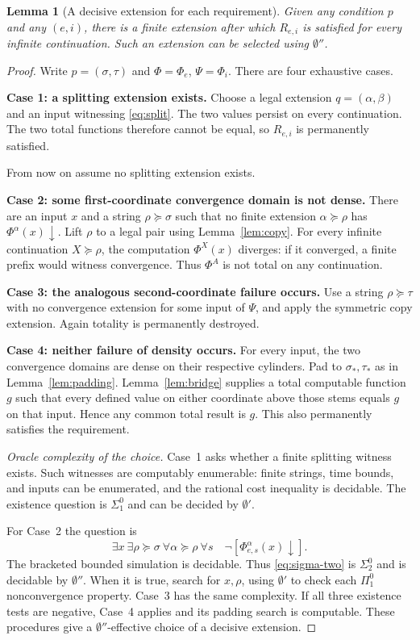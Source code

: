 \documentclass[11pt,a4paper]{article}
\newtheorem{lemma}[theorem]{Lemma}
\theoremstyle{definition}
\theoremstyle{remark}
\begin{document}
\begin{lemma}[A decisive extension for each requirement]\label{lem:decide}
Given any condition $p$ and any $(e,i)$, there is a finite extension after which $R_{e,i}$ is satisfied for every infinite continuation. Such an extension can be selected using $\emptyset''$.
\end{lemma}
\begin{proof}
Write $p=(\sigma,\tau)$ and $\Phi=\Phi_e$, $\Psi=\Phi_i$. There are four exhaustive cases.

\textbf{Case 1: a splitting extension exists.}
Choose a legal extension $q=(\alpha,\beta)$ and an input witnessing \eqref{eq:split}. The two values persist on every continuation. The two total functions therefore cannot be equal, so $R_{e,i}$ is permanently satisfied.

From now on assume no splitting extension exists.

\textbf{Case 2: some first-coordinate convergence domain is not dense.}
There are an input $x$ and a string $\rho\succeq\sigma$ such that no finite extension $\alpha\succeq\rho$ has $\Phi^\alpha(x)\downarrow$. Lift $\rho$ to a legal pair using Lemma~\ref{lem:copy}. For every infinite continuation $X\succeq\rho$, the computation $\Phi^X(x)$ diverges: if it converged, a finite prefix would witness convergence. Thus $\Phi^A$ is not total on any continuation.

\textbf{Case 3: the analogous second-coordinate failure occurs.}
Use a string $\rho\succeq\tau$ with no convergence extension for some input of $\Psi$, and apply the symmetric copy extension. Again totality is permanently destroyed.

\textbf{Case 4: neither failure of density occurs.}
For every input, the two convergence domains are dense on their respective cylinders. Pad to $\sigma_*,\tau_*$ as in Lemma~\ref{lem:padding}. Lemma~\ref{lem:bridge} supplies a total computable function $g$ such that every defined value on either coordinate above those stems equals $g$ on that input. Hence any common total result is $g$. This also permanently satisfies the requirement.

\textit{Oracle complexity of the choice.}
Case~1 asks whether a finite splitting witness exists. Such witnesses are computably enumerable: finite strings, time bounds, and inputs can be enumerated, and the rational cost inequality is decidable. The existence question is $\Sigma^0_1$ and can be decided by $\emptyset'$.

For Case~2 the question is
\begin{equation}\label{eq:sigma-two}
\exists x\ \exists\rho\succeq\sigma\ \forall\alpha\succeq\rho\ \forall s\quad
\neg[\Phi_{e,s}^{\alpha}(x)\downarrow].
\end{equation}
The bracketed bounded simulation is decidable. Thus \eqref{eq:sigma-two} is $\Sigma^0_2$ and is decidable by $\emptyset''$. When it is true, search for $x,\rho$, using $\emptyset'$ to check each $\Pi^0_1$ nonconvergence property. Case~3 has the same complexity. If all three existence tests are negative, Case~4 applies and its padding search is computable. These procedures give a $\emptyset''$-effective choice of a decisive extension.
\end{proof}
\end{document}
